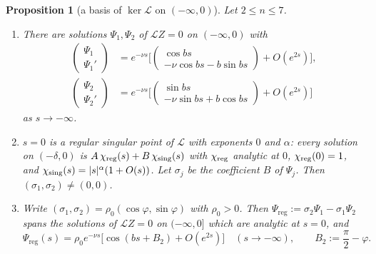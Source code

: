 \documentclass[11pt,a4paper]{amsart}
\newtheorem{proposition}[theorem]{Proposition}
\theoremstyle{definition}
\theoremstyle{remark}
\newcommand{\Preg}{\Psi_{\mathrm{reg}}}
\renewcommand{\theenumi}{\roman{enumi}}
\newenvironment{alphenum}{\begin{enumerate}\renewcommand{\theenumi}{\alph{enumi}}}{\end{enumerate}}
\begin{document}
\begin{proposition}[a basis of $\ker\mathcal L$ on $(-\infty,0)$]\label{prop:regular}
Let $2\le n\le7$.
\begin{alphenum}
\item There are solutions $\Psi_1,\Psi_2$ of $\mathcal LZ=0$ on $(-\infty,0)$ with
\begin{equation}\label{eq:levinson}
\begin{aligned}
\begin{pmatrix}\Psi_1\\ \Psi_1'\end{pmatrix}
&=e^{-\nu s}\Big[\begin{pmatrix}\cos bs\\ -\nu\cos bs-b\sin bs\end{pmatrix}+O(e^{2s})\Big],\\
\begin{pmatrix}\Psi_2\\ \Psi_2'\end{pmatrix}
&=e^{-\nu s}\Big[\begin{pmatrix}\sin bs\\ -\nu\sin bs+b\cos bs\end{pmatrix}+O(e^{2s})\Big]
\end{aligned}
\end{equation}
as $s\to-\infty$.
\item $s=0$ is a regular singular point of $\mathcal L$ with exponents $0$ and $\alpha$: every solution on $(-\delta,0)$ is $A\,\chi_{\rm reg}(s)+B\,\chi_{\rm sing}(s)$ with $\chi_{\rm reg}$ analytic at $0$, $\chi_{\rm reg}(0)=1$, and $\chi_{\rm sing}(s)=|s|^{\alpha}(1+O(s))$.  Let $\sigma_j$ be the coefficient $B$ of $\Psi_j$.  Then $(\sigma_1,\sigma_2)\ne(0,0)$.
\item Write $(\sigma_1,\sigma_2)=\rho_0(\cos\varphi,\sin\varphi)$ with $\rho_0>0$.  Then $\Preg:=\sigma_2\Psi_1-\sigma_1\Psi_2$ spans the solutions of $\mathcal LZ=0$ on $(-\infty,0]$ which are analytic at $s=0$, and
\begin{equation}\label{eq:Preg}
\Preg(s)=\rho_0e^{-\nu s}\big[\cos(bs+B_2)+O(e^{2s})\big]\quad(s\to-\infty),\qquad B_2:=\frac\pi2-\varphi .
\end{equation}
\end{alphenum}
\end{proposition}
\end{document}
